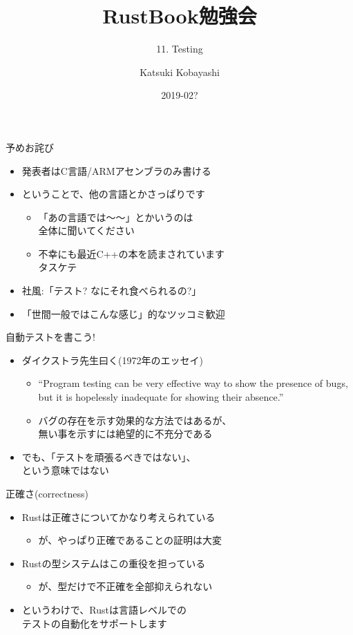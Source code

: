 \documentclass[cjk,14pt,xcolor=dvipsnames,table,dvipdfmx,professional font,t,fragile]{beamer}
\begin{document}
\title{RustBook勉強会}
\subtitle{11. Testing}
\author{Katsuki Kobayashi}
\date{2019-02?}

\maketitle

\begin{frame}{予めお詫び}
 \begin{itemize}
  \item 発表者はC言語/ARMアセンブラのみ書ける
  \item ということで、他の言語とかさっぱりです
	\begin{itemize}
	 \item 「あの言語では〜〜」とかいうのは\\
	       全体に聞いてください
	 \item 不幸にも最近C++の本を読まされています\\
	       タスケテ
	\end{itemize}
  \item 社風:「テスト? なにそれ食べられるの?」
  \item 「世間一般ではこんな感じ」的なツッコミ歓迎
 \end{itemize}
\end{frame}

\begin{frame}{自動テストを書こう!}
 \begin{itemize}
  \item ダイクストラ先生曰く(1972年のエッセイ)
	\begin{itemize}
	 \item 	{\scriptsize
		``Program testing can be very effective way to show the presence of bugs,
		but it is hopelessly inadequate for showing their absence.''}
	 \item バグの存在を示す効果的な方法ではあるが、\\
	       無い事を示すには絶望的に不充分である
	\end{itemize}
  \item でも、「テストを頑張るべきではない」、\\
	という意味ではない
 \end{itemize}
\end{frame}

\begin{frame}{正確さ(correctness)}
 \begin{itemize}
  \item Rustは正確さについてかなり考えられている
	\begin{itemize}
	 \item が、やっぱり正確であることの証明は大変
	\end{itemize}
  \item Rustの型システムはこの重役を担っている
	\begin{itemize}
	 \item が、型だけで不正確を全部抑えられない
	\end{itemize}
  \item というわけで、Rustは言語レベルでの\\
	テストの自動化をサポートします
 \end{itemize}
\end{frame}
\end{document}
